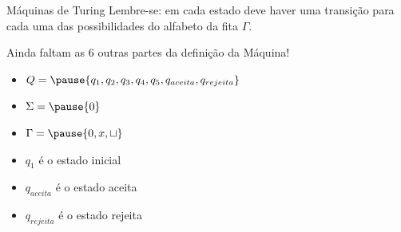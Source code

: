 \documentclass{beamer}
\begin{document}
\begin{frame}{Máquinas de Turing}
	Lembre-se: em cada estado deve haver uma transição para cada uma das possibilidades do alfabeto da fita $\Gamma$.
	\pause
	
	Ainda faltam as 6 outras partes da definição da Máquina!
	
	\begin{itemize}
		\item $Q = \pause\{q_{1}, q_{2}, q_{3}, q_{4}, q_{5}, q_{aceita}, q_{rejeita}\}$\pause
		\item $\Sigma = \pause\{0\}$\pause
		\item $\Gamma = \pause\{0, x, \sqcup\}$\pause
		\item $q_{1}$ é o estado inicial\pause
		\item $q_{aceita}$ é o estado aceita\pause
		\item $q_{rejeita}$ é o estado rejeita
	\end{itemize}
\end{frame}
\end{document}
